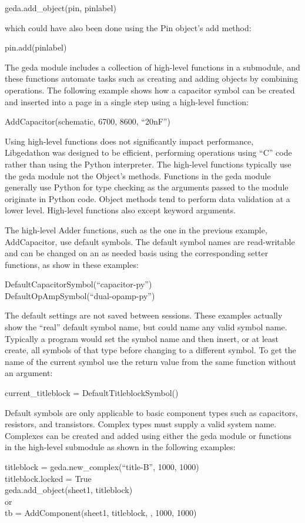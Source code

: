 geda.add\_object(pin, pinlabel)

  which could have also been done using the Pin object's add method:

pin.add(pinlabel)


  The geda module includes a collection of high-level functions in a submodule, and these functions automate tasks such as creating and adding objects by combining operations. The following example shows how a capacitor symbol can be created and inserted into a page in a single step using a high-level function:

AddCapacitor(schematic, 6700, 8600, ``20nF'')


  Using high-level functions does not significantly impact performance, Libgedathon was designed to be efficient, performing operations using ``C'' code rather than using the Python interpreter. The high-level functions typically use the geda module not the Object's methods. Functions in the geda module generally use Python for type checking as the arguments passed to the module originate in Python code. Object methods tend to perform data validation at a lower level. High-level functions also except keyword arguments.


  The high-level Adder functions, such as the one in the previous example, AddCapacitor, use default symbols. The default symbol names are read-writable and can be changed on an as needed basis using the corresponding setter functions, as show in these examples:

DefaultCapacitorSymbol(``capacitor-py'')
\\ 
DefaultOpAmpSymbol(``dual-opamp-py'')


  The default settings are not saved between sessions. These examples actually show the ``real'' default symbol name, but could name any valid symbol name. Typically a program would set the symbol name and then insert, or at least create, all symbols of that type before changing to a different symbol. To get the name of the current symbol use the return value from the same function without an argument:

current\_titleblock = DefaultTitleblockSymbol()


  Default symbols are only applicable to basic component types such as capacitors, resistors, and transistors. Complex types must supply a valid system name. Complexes can be created and added using either the geda module or functions in the high-level submodule as shown in the following examples:

titleblock = geda.new\_complex(``title-B'', 1000, 1000)\\ 
 titleblock.locked = True\\ 
 geda.add\_object(sheet1, titleblock)\\ 
 or\\ 
tb = AddComponent(sheet1, titleblock, , 1000, 1000)


